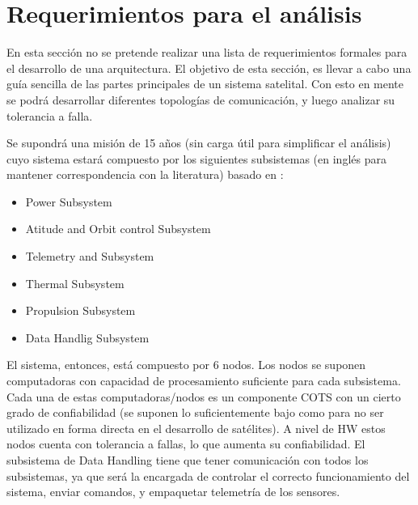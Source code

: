 \section{Requerimientos para el análisis}
En esta sección no se pretende realizar una lista de requerimientos formales para el desarrollo de una arquitectura. El objetivo de esta sección, es llevar a cabo una guía sencilla de las partes principales de un sistema satelital. Con esto en mente se podrá desarrollar diferentes topologías de comunicación, y luego analizar su tolerancia a falla.

Se supondrá una misión de 15 años (sin carga útil para simplificar el análisis) cuyo sistema estará compuesto por los siguientes subsistemas (en inglés para mantener correspondencia con la literatura) basado en \cite{Fontescue03}:
\begin{itemize}
\item Power Subsystem
\item Atitude and Orbit control Subsystem
\item Telemetry and Subsystem
\item Thermal Subsystem
\item Propulsion Subsystem
\item Data Handlig Subsystem
\end{itemize}

El sistema, entonces, está compuesto por 6 nodos. Los nodos se suponen computadoras con capacidad de procesamiento suficiente para cada subsistema. Cada una de estas computadoras/nodos es un componente COTS con un cierto grado de confiabilidad (se suponen lo suficientemente bajo como para no ser utilizado en forma directa en el desarrollo de satélites). A nivel de \ac{HW} estos nodos cuenta con tolerancia a fallas, lo que aumenta su confiabilidad. El subsistema de Data Handling tiene que tener comunicación con todos los subsistemas, ya que será la encargada de controlar el correcto funcionamiento del sistema, enviar comandos, y empaquetar telemetría de los sensores.



